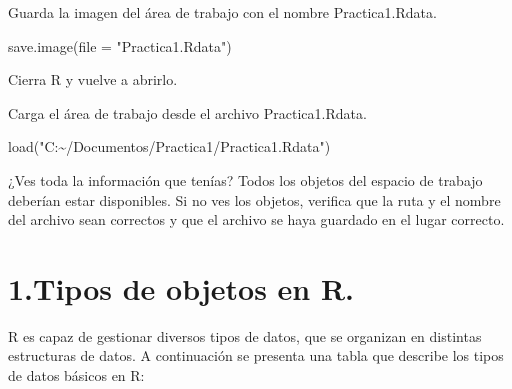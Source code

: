 \documentclass[
  letterpaper,
]{scrbook}
\newenvironment{Shaded}{\begin{snugshade}}{\end{snugshade}}
\newcommand{\AttributeTok}[1]{\textcolor[rgb]{0.40,0.45,0.13}{#1}}
\newcommand{\FunctionTok}[1]{\textcolor[rgb]{0.28,0.35,0.67}{#1}}
\newcommand{\NormalTok}[1]{\textcolor[rgb]{0.00,0.23,0.31}{#1}}
\newcommand{\StringTok}[1]{\textcolor[rgb]{0.13,0.47,0.30}{#1}}
\begin{document}
Guarda la imagen del área de trabajo con el nombre Practica1.Rdata.

\begin{Shaded}
\begin{Highlighting}[]
\FunctionTok{save.image}\NormalTok{(}\AttributeTok{file =} \StringTok{"Practica1.Rdata"}\NormalTok{)}
\end{Highlighting}
\end{Shaded}

Cierra R y vuelve a abrirlo.

Carga el área de trabajo desde el archivo Practica1.Rdata.

\begin{Shaded}
\begin{Highlighting}[]
\FunctionTok{load}\NormalTok{(}\StringTok{"C:\textasciitilde{}/Documentos/Practica1/Practica1.Rdata"}\NormalTok{)}
\end{Highlighting}
\end{Shaded}

¿Ves toda la información que tenías? Todos los objetos del espacio de
trabajo deberían estar disponibles. Si no ves los objetos, verifica que
la ruta y el nombre del archivo sean correctos y que el archivo se haya
guardado en el lugar correcto.

\hypertarget{tipos-de-objetos-en-r.}{%
\chapter{1.Tipos de objetos en R.}\label{tipos-de-objetos-en-r.}}

R es capaz de gestionar diversos tipos de datos, que se organizan en
distintas estructuras de datos. A continuación se presenta una tabla que
describe los tipos de datos básicos en R:
\end{document}

